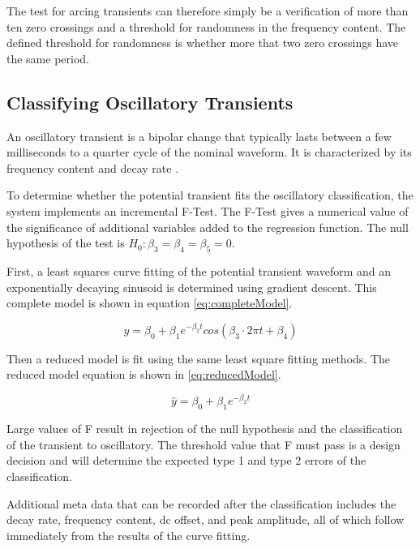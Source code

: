 \documentclass[10pt, conference, compsocconf]{IEEEtran}
\begin{document}
The test for arcing transients can therefore simply be a verification of more than ten zero crossings and a threshold for randomness in the frequency content. The defined threshold for randomness is whether more that two zero crossings have the same period.

\subsection{Classifying Oscillatory Transients}

An oscillatory transient is a bipolar change that typically lasts between a few milliseconds to a quarter cycle of the nominal waveform. It is characterized by its frequency content and decay rate \cite{IEEE:2018:1159D3}.

To determine whether the potential transient fits the oscillatory classification, the system implements an incremental F-Test. The F-Test gives a numerical value of the significance of additional variables added to the regression function. The null hypothesis of the test is  $H_0: \beta_3 = \beta_4 = \beta_5 = 0$.

First, a least squares curve fitting of the potential transient waveform and an exponentially decaying sinusoid is determined using gradient descent. This complete model  is shown in equation \ref{eq:completeModel}.

\begin{equation}
\label{eq:completeModel}
\hat{y} = \beta_0 + \beta_1 e^{-\beta_2 t} cos(\beta_3 \cdot 2 \pi t + \beta_4)
\end{equation}

Then a reduced model is fit using the same least square fitting methods. The reduced model equation is shown in \ref{eq:reducedModel}.

\begin{equation}
\label{eq:reducedModel}
\hat{y} = \beta_0 + \beta_1 e^{-\beta_2 t}
\end{equation}

Large values of F result in rejection of the null hypothesis and the classification of the transient to oscillatory. The threshold value that F must pass is a design decision and will determine the expected type 1 and type 2 errors of the classification.

Additional meta data that can be recorded after the classification includes the decay rate, frequency content, dc offset, and peak amplitude, all of which follow immediately from the results of the curve fitting.
\end{document}
